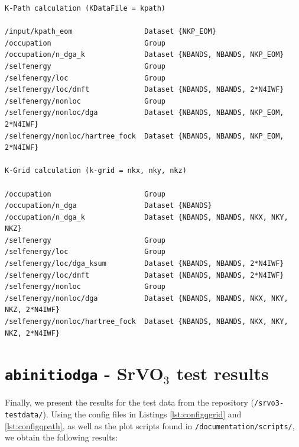 \documentclass[a4paper,11pt]{article}
\numberwithin{equation}{section} %
\begin{document}
\begin{lstlisting}[caption=equation of motion output comparison, frame=single, basicstyle=\small]
K-Path calculation (KDataFile = kpath)

/input/kpath_eom                 Dataset {NKP_EOM}
/occupation                      Group
/occupation/n_dga_k              Dataset {NBANDS, NBANDS, NKP_EOM}
/selfenergy                      Group
/selfenergy/loc                  Group
/selfenergy/loc/dmft             Dataset {NBANDS, NBANDS, 2*N4IWF}
/selfenergy/nonloc               Group
/selfenergy/nonloc/dga           Dataset {NBANDS, NBANDS, NKP_EOM, 2*N4IWF}
/selfenergy/nonloc/hartree_fock  Dataset {NBANDS, NBANDS, NKP_EOM, 2*N4IWF}

K-Grid calculation (k-grid = nkx, nky, nkz)

/occupation                      Group
/occupation/n_dga                Dataset {NBANDS}
/occupation/n_dga_k              Dataset {NBANDS, NBANDS, NKX, NKY, NKZ}
/selfenergy                      Group
/selfenergy/loc                  Group
/selfenergy/loc/dga_ksum         Dataset {NBANDS, NBANDS, 2*N4IWF}
/selfenergy/loc/dmft             Dataset {NBANDS, NBANDS, 2*N4IWF}
/selfenergy/nonloc               Group
/selfenergy/nonloc/dga           Dataset {NBANDS, NBANDS, NKX, NKY, NKZ, 2*N4IWF}
/selfenergy/nonloc/hartree_fock  Dataset {NBANDS, NBANDS, NKX, NKY, NKZ, 2*N4IWF}
\end{lstlisting}

\newpage
\section{\protect\Verb+abinitiodga+ - SrVO$_3$ test results}

Finally, we present the results for the test data from the repository (\verb+/srvo3-testdata/+).
Using the config files in Listings \ref{lst:configqgrid} and \ref{lst:configqpath}, as well as the plot scripts
found in {\color{blue}\verb+/documentation/scripts/+}, we obtain the following results:
\end{document}
